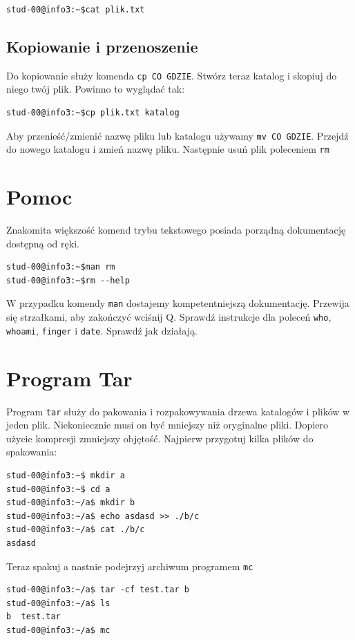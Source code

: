 \documentclass[landscape]{article}
\begin{document}
\begin{verbatim}
stud-00@info3:~$cat plik.txt
\end{verbatim}

\subsection{Kopiowanie i przenoszenie}

Do kopiowanie służy komenda {\tt cp CO GDZIE}. Stwórz teraz katalog i skopiuj do niego twój plik. Powinno to wyglądać tak:
\begin{verbatim}
stud-00@info3:~$cp plik.txt katalog
\end{verbatim}

Aby przenieść/zmienić nazwę pliku lub katalogu używamy {\tt mv CO GDZIE}. Przejdź do nowego katalogu i zmień nazwę pliku. Następnie usuń plik poleceniem {\tt rm}

\section{Pomoc}
Znakomita większość komend trybu tekstowego posiada porządną dokumentację dostępną od ręki.
\begin{verbatim}
stud-00@info3:~$man rm
stud-00@info3:~$rm --help
\end{verbatim}
W przypadku komendy {\tt man} dostajemy kompetentniejszą dokumentację. Przewija się strzałkami, aby zakończyć wciśnij Q.
Sprawdź instrukcje dla poleceń {\tt who}, {\tt whoami}, {\tt finger} i  {\tt date}. Sprawdź jak działają.

\section{Program Tar}
Program {\tt tar} służy do pakowania i rozpakowywania drzewa katalogów i plików w jeden plik. Niekoniecznie musi on być mniejszy niż oryginalne pliki. Dopiero użycie kompresji zmniejszy objętość. Najpierw przygotuj kilka plików do spakowania:
\begin{verbatim}
stud-00@info3:~$ mkdir a
stud-00@info3:~$ cd a
stud-00@info3:~/a$ mkdir b
stud-00@info3:~/a$ echo asdasd >> ./b/c
stud-00@info3:~/a$ cat ./b/c
asdasd
\end{verbatim}

Teraz spakuj a nastnie podejrzyj archiwum programem {\tt mc}

\begin{verbatim}
stud-00@info3:~/a$ tar -cf test.tar b
stud-00@info3:~/a$ ls
b  test.tar
stud-00@info3:~/a$ mc
\end{verbatim}
\end{document}
